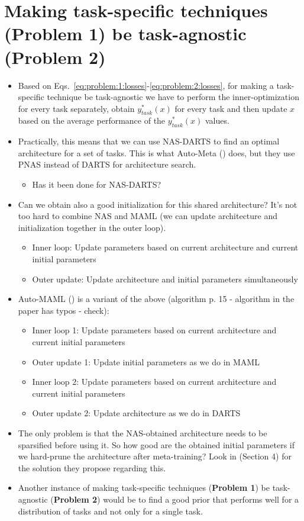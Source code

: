 \section{Making task-specific techniques (Problem 1) be task-agnostic (Problem 2)}\label{sec:making:agnostic}
\begin{itemize}
\item Based on Eqs.~\eqref{eq:problem:1:losses}-\eqref{eq:problem:2:losses}, for making a task-specific technique be task-agnostic we have to perform the inner-optimization for every task separately, obtain $y^*_{task}(x)$ for every task and then update $x$ based on the average performance of the $y^*_{task}(x)$ values.

\item Practically, this means that we can use NAS-DARTS to find an optimal architecture for a set of tasks. 
This is what Auto-Meta (\cite{kim2018autometa}) does, but they use PNAS instead of DARTS for architecture search.

\begin{itemize}
	\item Has it been done for NAS-DARTS?
\end{itemize}
\item Can we obtain also a good initialization for this shared architecture? It's not too hard to combine NAS and MAML (we can update architecture and initialization together in the outer loop).
\begin{itemize}
	\item Inner loop: Update parameters based on current architecture and current initial parameters
	\item Outer update: Update architecture and initial parameters simultaneously
\end{itemize}
\item Auto-MAML (\cite{lian2019fast}) is a variant of the above (algorithm p. 15 - algorithm in the paper has typos - check):
\begin{itemize}
	\item Inner loop 1: Update parameters based on current architecture and current initial parameters
	\item Outer update 1: Update initial parameters as we do in MAML
	\item Inner loop 2: Update parameters based on current architecture and current initial parameters
	\item Outer update 2: Update architecture as we do in DARTS
\end{itemize}

\item The only problem is that the NAS-obtained architecture needs to be sparsified before using it. So how good are the obtained initial parameters if we hard-prune the architecture after meta-training? Look in \textcite{elsken2020metalearning} (Section 4) for the solution they propose regarding this.

\item Another instance of making task-specific techniques (\textbf{Problem 1}) be task-agnostic (\textbf{Problem 2}) would be to find a good prior that performs well for a distribution of tasks and not only for a single task.
\end{itemize}

